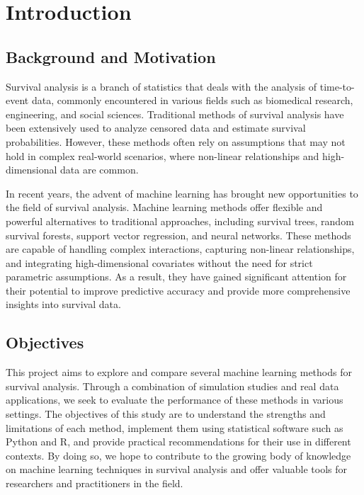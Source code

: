 \documentclass{article}
\begin{document}


\tableofcontents
\newpage

\section{Introduction}
\subsection{Background and Motivation}
Survival analysis is a branch of statistics that deals with the analysis of time-to-event data, commonly encountered in various fields such as biomedical research, engineering, and social sciences. Traditional methods of survival analysis have been extensively used to analyze censored data and estimate survival probabilities. However, these methods often rely on assumptions that may not hold in complex real-world scenarios, where non-linear relationships and high-dimensional data are common.

In recent years, the advent of machine learning has brought new opportunities to the field of survival analysis. Machine learning methods offer flexible and powerful alternatives to traditional approaches, including survival trees, random survival forests, support vector regression, and neural networks. These methods are capable of handling complex interactions, capturing non-linear relationships, and integrating high-dimensional covariates without the need for strict parametric assumptions. As a result, they have gained significant attention for their potential to improve predictive accuracy and provide more comprehensive insights into survival data.

\subsection{Objectives}
This project aims to explore and compare several machine learning methods for survival analysis. Through a combination of simulation studies and real data applications, we seek to evaluate the performance of these methods in various settings. The objectives of this study are to understand the strengths and limitations of each method, implement them using statistical software such as Python and R, and provide practical recommendations for their use in different contexts. By doing so, we hope to contribute to the growing body of knowledge on machine learning techniques in survival analysis and offer valuable tools for researchers and practitioners in the field.
\end{document}
